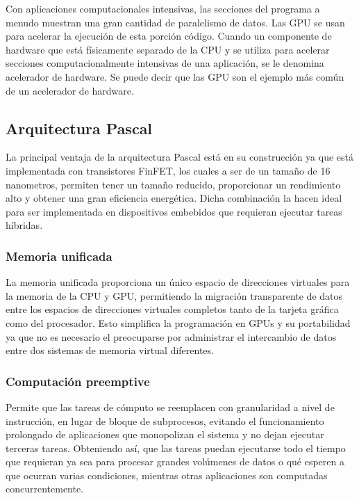     \vspace{0.3cm}
    Con aplicaciones computacionales intensivas, las secciones del programa a menudo muestran una gran cantidad de paralelismo de datos. Las GPU se usan para acelerar la ejecución de esta porción código. Cuando un componente de hardware que está físicamente separado de la CPU y se utiliza para acelerar secciones computacionalmente intensivas de una aplicación, se le denomina acelerador de hardware. Se puede decir que las GPU son el ejemplo más común de un acelerador de hardware.

    \subsection{Arquitectura Pascal}

    La principal ventaja de la arquitectura Pascal está en su construcción ya que está implementada con transistores FinFET\cite{PasGPU}, los cuales a ser de un tamaño de 16 nanometros, permiten tener un tamaño reducido, proporcionar un rendimiento alto y obtener una gran eficiencia energética. Dicha combinación la hacen ideal para ser implementada en dispositivos embebidos que requieran ejecutar tareas híbridas.
     
    \subsubsection{Memoria unificada} \label{sec:MemUni}
     La memoria unificada proporciona un único espacio de direcciones virtuales para la memoria de la CPU y GPU, permitiendo la migración transparente de datos entre los espacios de direcciones virtuales completos tanto de la tarjeta gráfica como del procesador. Esto simplifica la programación en GPUs y su portabilidad ya que no es necesario el  preocuparse por administrar el intercambio de datos entre dos sistemas de memoria virtual diferentes\cite{WPNV}.
     
     
    \subsubsection{Computación preemptive}
    Permite que las tareas de cómputo se reemplacen con granularidad a nivel de instrucción, en lugar de bloque de subprocesos, evitando el funcionamiento prolongado de aplicaciones que monopolizan el sistema y no dejan ejecutar terceras tareas\cite{WPNV}. Obteniendo así, que las tareas puedan ejecutarse todo el tiempo que requieran ya sea para procesar grandes volúmenes de datos o qué esperen a que ocurran varias condiciones, mientras otras aplicaciones son computadas concurrentemente.

